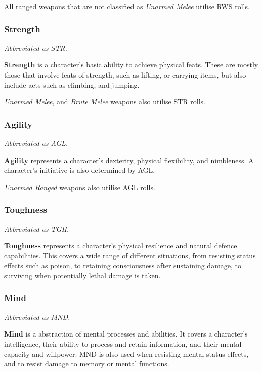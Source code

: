 \documentclass[12pt,]{article}
\begin{document}
All ranged weapons that are not classified as \emph{Unarmed Melee}
utilise RWS rolls.

\subsubsection{Strength}\label{strength}

\emph{Abbreviated as STR.}

\textbf{Strength} is a character's basic ability to achieve physical
feats. These are mostly those that involve feats of strength, such as
lifting, or carrying items, but also include acts such as climbing, and
jumping.

\emph{Unarmed Melee}, and \emph{Brute Melee} weapons also utilise STR
rolls.

\subsubsection{Agility}\label{agility}

\emph{Abbreviated as AGL.}

\textbf{Agility} represents a character's dexterity, physical
flexibility, and nimbleness. A character's initiative is also determined
by AGL.

\emph{Unarmed Ranged} weapons also utilise AGL rolls.

\subsubsection{Toughness}\label{toughness}

\emph{Abbreviated as TGH.}

\textbf{Toughness} represents a character's physical resilience and
natural defence capabilities. This covers a wide range of different
situations, from resisting status effects such as poison, to retaining
consciousness after sustaining damage, to surviving when potentially
lethal damage is taken.

\subsubsection{Mind}\label{mind}

\emph{Abbreviated as MND.}

\textbf{Mind} is a abstraction of mental processes and abilities. It
covers a character's intelligence, their ability to process and retain
information, and their mental capacity and willpower. MND is also used
when resisting mental status effects, and to resist damage to memory or
mental functions.
\end{document}
